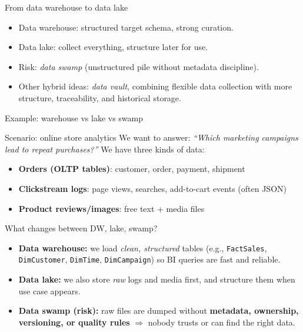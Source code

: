 \documentclass[10pt,aspectratio=169]{beamer}
\newenvironment{examplebox}[1][Example]{\begin{exampleblock}{#1}}{\end{exampleblock}}
\begin{document}
\begin{frame}{From data warehouse to data lake}
\begin{itemize}
  \item Data warehouse: structured target schema, strong curation.
  \item Data lake: collect everything, structure later for use.
  \item Risk: \emph{data swamp} (unstructured pile without metadata discipline).
  \item Other hybrid ideas: \emph{data vault}, combining flexible data collection with more structure, traceability, and historical storage.
\end{itemize}
\end{frame}

\begin{frame}{Example: warehouse vs lake vs swamp}
\small
\begin{examplebox}[Scenario: online store analytics]
\small
We want to answer: \emph{``Which marketing campaigns lead to repeat purchases?''}
We have three kinds of data:
\begin{itemize}
  \item \textbf{Orders (OLTP tables)}: customer, order, payment, shipment
  \item \textbf{Clickstream logs}: page views, searches, add-to-cart events (often JSON)
  \item \textbf{Product reviews/images}: free text + media files
\end{itemize}
\end{examplebox}
\begin{block}{What changes between DW, lake, swamp?}
\begin{itemize}
  \item \textbf{Data warehouse:} we load \emph{clean, structured} tables
  (e.g., \texttt{FactSales}, \texttt{DimCustomer}, \texttt{DimTime}, \texttt{DimCampaign})
  so BI queries are fast and reliable.
  \item \textbf{Data lake:} we also store \emph{raw} logs and media first,
  and structure them when use case appears.
  \item \textbf{Data swamp (risk):} raw files are dumped without
  \textbf{metadata, ownership, versioning, or quality rules} $\Rightarrow$
  nobody trusts or can find the right data.
\end{itemize}
\end{block}

\end{frame}
\end{document}
